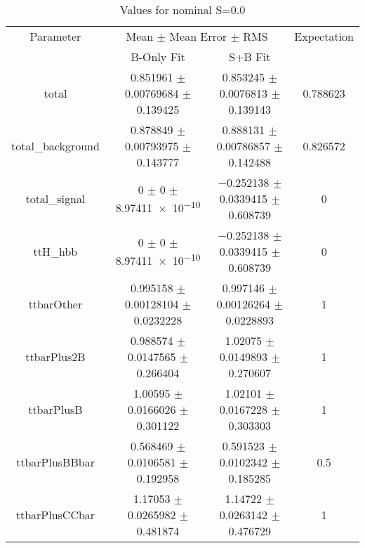 \begin{table}
\centering
\caption{Values for nominal S=0.0}
\begin{tabular}{cccc}
\toprule
Parameter & \multicolumn{2}{c}{Mean $\pm$ Mean Error $\pm$ RMS} & Expectation\\
 & B-Only Fit & S+B Fit & \\
\midrule
total & \num{0.851961} $\pm$ \num{0.00769684} $\pm$ \num{0.139425} & \num{0.853245} $\pm$ \num{0.0076813} $\pm$ \num{0.139143} & \num{0.788623}\\
total\_background & \num{0.878849} $\pm$ \num{0.00793975} $\pm$ \num{0.143777} & \num{0.888131} $\pm$ \num{0.00786857} $\pm$ \num{0.142488} & \num{0.826572}\\
total\_signal & \num{0} $\pm$ \num{0} $\pm$ \num{8.97411e-10} & \num{-0.252138} $\pm$ \num{0.0339415} $\pm$ \num{0.608739} & \num{0}\\
ttH\_hbb & \num{0} $\pm$ \num{0} $\pm$ \num{8.97411e-10} & \num{-0.252138} $\pm$ \num{0.0339415} $\pm$ \num{0.608739} & \num{0}\\
ttbarOther & \num{0.995158} $\pm$ \num{0.00128104} $\pm$ \num{0.0232228} & \num{0.997146} $\pm$ \num{0.00126264} $\pm$ \num{0.0228893} & \num{1}\\
ttbarPlus2B & \num{0.988574} $\pm$ \num{0.0147565} $\pm$ \num{0.266404} & \num{1.02075} $\pm$ \num{0.0149893} $\pm$ \num{0.270607} & \num{1}\\
ttbarPlusB & \num{1.00595} $\pm$ \num{0.0166026} $\pm$ \num{0.301122} & \num{1.02101} $\pm$ \num{0.0167228} $\pm$ \num{0.303303} & \num{1}\\
ttbarPlusBBbar & \num{0.568469} $\pm$ \num{0.0106581} $\pm$ \num{0.192958} & \num{0.591523} $\pm$ \num{0.0102342} $\pm$ \num{0.185285} & \num{0.5}\\
ttbarPlusCCbar & \num{1.17053} $\pm$ \num{0.0265982} $\pm$ \num{0.481874} & \num{1.14722} $\pm$ \num{0.0263142} $\pm$ \num{0.476729} & \num{1}\\
\bottomrule
\end{tabular}
\end{table}